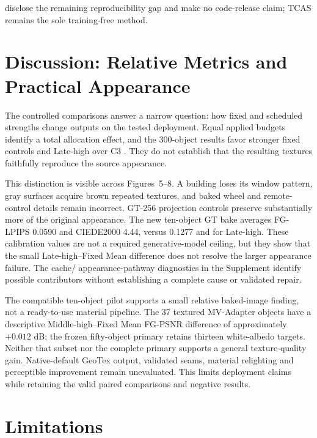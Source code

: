 \documentclass[times,twocolumn,final]{elsarticle}
\providecommand{\DIFadd}[1]{{\protect\color{blue} \sf #1}} %
\providecommand{\DIFaddbegin}{} %
\providecommand{\DIFaddend}{} %
\begin{document}
 \DIFaddbegin \DIFadd{disclose the remaining reproducibility gap and make no code-release claim; TCAS remains the sole training-free method}\DIFaddend .

  \DIFaddbegin \section{Discussion: Relative Metrics and Practical Appearance}
\DIFadd{The controlled comparisons answer a narrow question: how fixed and scheduled strengths change outputs on the tested deployment. Equal applied budgets identify a total allocation effect, and the 300-object results favor stronger fixed controls and Late-high over }\DIFaddend C3  \DIFaddbegin \DIFadd{. They do not establish that the resulting textures faithfully reproduce the source appearance.
}\DIFaddend 

  \DIFaddbegin \DIFadd{This distinction is visible across Figures~5--8. A building loses its window pattern, gray surfaces acquire brown repeated textures, and baked wheel and remote-control details remain incorrect. GT-256 projection controls preserve substantially more of the original appearance. The new ten-object GT bake averages FG-LPIPS 0.0590 }\DIFaddend and   \DIFaddbegin \DIFadd{CIEDE2000 4.44, versus 0.1277 }\DIFaddend and   \DIFaddbegin \DIFadd{21.65 for Late-high. These calibration values are not a required generative-model ceiling, but they show that the small Late-high--Fixed Mean difference does not resolve the larger appearance failure. The cache}\DIFaddend /  \DIFaddbegin \DIFadd{appearance-pathway diagnostics in the Supplement identify possible contributors without establishing a complete cause or validated repair.
}\DIFaddend 

  \DIFaddbegin \DIFadd{The compatible ten-object pilot supports a small relative baked-image finding, not a ready-to-use material pipeline. The 37 textured MV-Adapter objects have a descriptive Middle-high--Fixed Mean FG-PSNR difference of approximately $+0.012$ dB; the frozen fifty-object primary retains thirteen white-albedo targets. Neither that subset nor the complete primary supports a general texture-quality gain. Native-default GeoTex output, validated seams, material relighting and perceptible improvement remain unevaluated. This limits deployment claims while retaining the valid paired comparisons and negative results.
}\DIFaddend 

\section{Limitations}
\label{sec:limitations}
\end{document}
